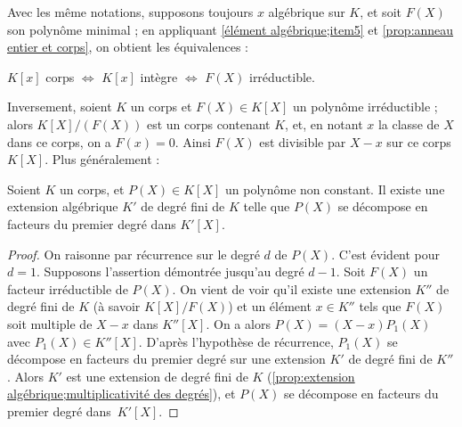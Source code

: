 \documentclass[11pt, useosf,
  title in boldface,
  theorem in new line,
  theorem numbering = section,
  number theorems separately,
]{simplivre}
\begin{document}
    Avec les même notations, supposons toujours \( x \) algébrique sur \( K \), et soit \( F(X) \) son polynôme minimal ; en appliquant \ref{élément algébrique;item5} et \cref{prop:anneau entier et corps}, on obtient les équivalences :
    \begin{enumerate-Roman}[resume]\itshape
        \item \( K[x] \) corps \( \iff \) \( K[x] \) intègre \( \iff \) \( F(X) \) irréductible.
    \end{enumerate-Roman}
    Inversement, soient \( K \) un corps et \( F(X) \in K[X] \) un polynôme irréductible ; alors \( K[X]/(F(X)) \) est un corps contenant \( K \), et, en notant \( x \) la classe de \( X \) dans ce corps, on a \( F(x) = 0 \). Ainsi \( F(X) \) est divisible par \( X-x \) sur ce corps \( K[X] \). Plus généralement :
    \begin{proposition}\label{prop:existence d'une extension algébrique telle que le polynôme se décompose}
        Soient \( K \) un corps, et \( P(X) \in K[X] \) un polynôme non constant. Il existe une extension algébrique \( K' \) de degré fini de \( K \) telle que \( P(X) \) se décompose en facteurs du premier degré dans \( K'[X] \).
    \end{proposition}
    \begin{proof}
        On raisonne par récurrence sur le degré \( d \) de \( P(X) \). C'est évident pour \( d = 1 \). Supposons l'assertion démontrée jusqu'au degré \( d-1 \). Soit \( F(X) \) un facteur irréductible de \( P(X) \). On vient de voir qu'il existe une extension \( K'' \) de degré fini de \( K \) (à savoir \( K[X]/F(X) \)) et un élément \( x \in K'' \) tels que \( F(X) \) soit multiple de \( X-x \) dans \( K''[X] \). On a alors \( P(X) = (X-x)P_1(X) \) avec \( P_1(X) \in K''[X] \). D'après l'hypothèse de récurrence, \( P_1(X) \) se décompose en facteurs du premier degré sur une extension \( K' \) de degré fini de \( K'' \). Alors \( K' \) est une extension de degré fini de \( K \) (\cref{prop:extension algébrique;multiplicativité des degrés}), et \( P(X) \) se décompose en facteurs du premier degré dans~\( K'[X] \).
    \end{proof}
\end{document}
